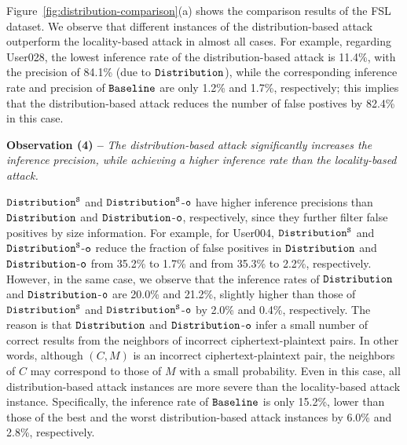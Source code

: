\documentclass[bachelor]{thesis-uestc}
\begin{document}

Figure~\ref{fig:distribution-comparison}(a) shows the
comparison results of the FSL dataset. We observe that different instances of
the distribution-based attack outperform the locality-based attack in almost
all cases. For example, regarding User028, the lowest inference rate of the
distribution-based attack is 11.4\%, with the precision of 84.1\% (due to $\tt
Distribution$), while the corresponding inference rate and precision of
$\tt Baseline$ are only 1.2\% and 1.7\%, respectively; this implies that the distribution-based attack reduces the number of false postives by 82.4\% in this case.   

{\bf Observation (4) --} {\em The distribution-based attack significantly
increases the inference precision, while achieving a higher inference rate than
the locality-based attack.} 

$\tt Distribution^S$ and $\tt Distribution^S$-$\tt o$ have higher inference
precisions than $\tt Distribution$ and $\tt Distribution$-$\tt o$,
respectively, since they further filter false positives by size information.
For example, for User004, $\tt Distribution^S$ and $\tt Distribution^S$-$\tt o$  reduce the fraction of false positives in  $\tt Distribution$ and $\tt Distribution$-$\tt o$ from 35.2\% to 1.7\% and from 35.3\% to 2.2\%, respectively. However, in the same case,    
 we observe that the inference rates of $\tt Distribution$ and $\tt Distribution$-$\tt o$ are 20.0\% and 21.2\%, slightly higher than those of  
$\tt Distribution^S$ and
$\tt Distribution^S$-$\tt o$ by 2.0\% and
0.4\%, respectively. The reason is that $\tt Distribution$ and $\tt
Distribution$-$\tt o$ infer a small number of correct results from the
neighbors of incorrect ciphertext-plaintext pairs. In other words,  although
$(C, M)$ is an incorrect ciphertext-plaintext pair, the neighbors of $C$ may
correspond to those of $M$ with a small probability. Even in this case, all distribution-based attack instances are more severe than the locality-based attack instance. Specifically, the inference rate of $\tt Baseline$ is only 15.2\%, lower than those of the best and the worst distribution-based attack instances by 6.0\% and 2.8\%, respectively. 
\end{document}
